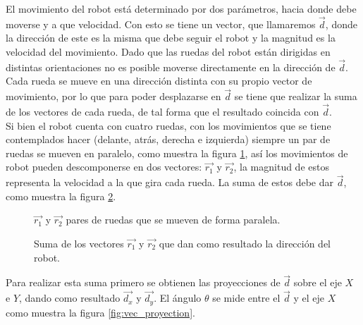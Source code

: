 \documentclass{iccmemoria}
\begin{document}
El movimiento del robot está determinado por dos parámetros, hacia donde debe moverse y a que velocidad. Con esto se tiene un vector, que llamaremos $\vec{d}$, donde la dirección de este es la misma que debe seguir el robot y la magnitud es la velocidad del movimiento. Dado que las ruedas del robot están dirigidas en distintas orientaciones no es posible moverse directamente en la dirección de $\vec{d}$. Cada rueda se mueve en una dirección distinta con su propio vector de movimiento, por lo que para poder desplazarse en $\vec{d}$ se tiene que realizar la suma de los vectores de cada rueda, de tal forma que el resultado coincida con $\vec{d}$.\\

Si bien el robot cuenta con cuatro ruedas, con los movimientos que se tiene contemplados hacer (delante, atrás, derecha e izquierda) siempre un par de ruedas se mueven en paralelo, como muestra la figura \ref{fig:omni_vector}, así los movimientos de robot pueden descomponerse en dos vectores: $\vec{r_{1}}$ y $\vec{r_{2}}$, la magnitud de estos representa la velocidad a la que gira cada rueda. La suma de estos debe dar $\vec{d}$, como muestra la figura \ref{fig:vec_sum}.\\

\begin{figure}[H]
  \centering
  \begin{large}
  
  \end{large}
  \caption[Movimiento de las ruedas del robot omnidireccional.]{$\vec{r_{1}}$ y $\vec{r_{2}}$ pares de ruedas que se mueven de forma paralela.}
  \label{fig:omni_vector}
\end{figure}

\begin{figure}[H]
  \centering
  \begin{large}
  
  \end{large}
  \caption[Suma de los vectores que dan la dirección del robot.]{Suma de los vectores $\vec{r_{1}}$ y $\vec{r_{2}}$ que dan como resultado la dirección del robot.}
  \label{fig:vec_sum}
\end{figure}

Para realizar esta suma primero se obtienen las proyecciones de $\vec{d}$ sobre el eje $X$ e $Y$, dando como resultado $\vec{d_{x}}$ y $\vec{d_{y}}$. El ángulo $\theta$ se mide entre el $\vec{d}$ y el eje $X$ como muestra la figura \ref{fig:vec_proyection}.\\
\end{document}

